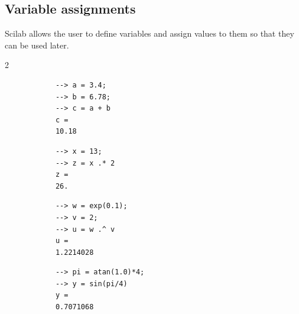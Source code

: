 	\subsection{Variable assignments} \label{ssec:variable-assignment}
		Scilab allows the user to define variables and assign values to them so that they can be used later.
		\begin{multicols}{2}
		\begin{verbatim}
			--> a = 3.4;
			--> b = 6.78;
			--> c = a + b
			c =
			10.18
		\end{verbatim}
		
		\begin{verbatim}
			--> x = 13;
			--> z = x .* 2
			z =
			26.
		\end{verbatim}
		
		\begin{verbatim}
			--> w = exp(0.1);
			--> v = 2;
			--> u = w .^ v
			u =
			1.2214028
		\end{verbatim}
		
		\begin{verbatim}
			--> pi = atan(1.0)*4;
			--> y = sin(pi/4)
			y =
			0.7071068
		\end{verbatim}
		\end{multicols}
		

